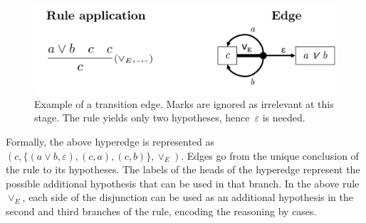     \begin{figure}[h]
        \centering
        \includegraphics[width=0.7\linewidth]{resources/te-example.jpg}
        \caption{Example of a transition edge. Marks are ignored as irrelevant at this stage. The rule yields only two hypotheses, hence~$\varepsilon$ is needed.}
        \label{fig:te-ex}
    \end{figure}

Formally, the above hyperedge is represented as $(c, \{(a \vee b, \varepsilon), (c, a), (c, b)\}, \vee_E)$. Edges go from the unique conclusion of the rule to its hypotheses. The labels of the heads of the hyperedge represent the possible additional hypothesis that can be used in that branch. In the above rule $\vee_E$, each side of the disjunction can be used as an additional hypothesis in the second and third branches of the rule, encoding the reasoning by cases. 

